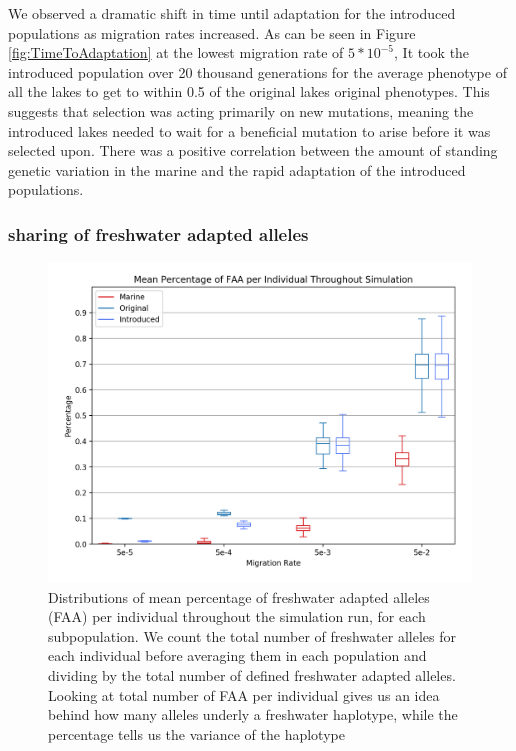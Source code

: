 \documentclass{article}
\newcommand{\plr}[1]{\todo[linecolor=blue,backgroundcolor=blue!25,bordercolor=blue]{#1}}
\begin{document}
We observed a dramatic shift in time until adaptation for the introduced populations
as migration rates increased. 
As can be seen in Figure \ref{fig:TimeToAdaptation} at the lowest migration rate of $5 * 10^{-5}$,
It took the introduced population over 20 thousand generations for the average phenotype of all the lakes to 
get to within 0.5 of the original lakes original phenotypes. 
This suggests that selection was acting primarily on new mutations, meaning the 
introduced lakes needed to wait for a beneficial mutation to arise before 
it was selected upon. 
There was a positive correlation between the amount of standing genetic variation in the 
marine and the rapid adaptation of the introduced populations.

 
\subsubsection*{sharing of freshwater adapted alleles}

\begin{figure}
	\begin{center}
  		\includegraphics[width=\linewidth]{matplotlibPlots/MPFAI.png}
  		\caption{Distributions of mean percentage of freshwater adapted alleles (FAA) per individual throughout the simulation run, for each subpopulation.
		We count the total number of freshwater alleles for each individual before averaging them in each population and dividing by the total number of defined
		freshwater adapted alleles.
		Looking at total number of FAA per individual gives us an idea behind how many alleles underly a freshwater haplotype, 
		while the percentage tells us the variance of the haplotype}
		\label{fig:MPFAI}
	\end{center}
\end{figure}
\end{document}
